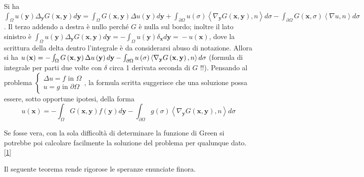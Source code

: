 \documentclass{article}
\begin{document}
Si ha $\int_{\Omega }u\left( \mathbf{y}\right) \Delta _{\mathbf{y}}G\left( 
\mathbf{x,y}\right) d\mathbf{y}=\int_{\Omega }G\left( \mathbf{x,y}\right)
\Delta u\left( \mathbf{y}\right) d\mathbf{y}+\int_{\partial \Omega }u\left(
\sigma \right) \left\langle \nabla _{\mathbf{y}}G\left( \mathbf{x,y}\right)
,n\right\rangle d\sigma -\int_{\partial \Omega }G\left( \mathbf{x},\sigma
\right) \left\langle \nabla u,n\right\rangle d\sigma $. Il terzo addendo a
destra \`{e} nullo perch\'{e} $G$ \`{e} nulla sul bordo; inoltre il lato
sinistro \`{e} $\int_{\Omega }u\left( \mathbf{y}\right) \Delta _{\mathbf{y}%
}G\left( \mathbf{x,y}\right) d\mathbf{y}=-\int_{\Omega }u\left( \mathbf{y}%
\right) \delta _{\mathbf{x}}d\mathbf{y=}-u\left( \mathbf{x}\right) $, dove
la scrittura della delta dentro l'integrale \`{e} da considerarsi abuso di
notazione. Allora si ha $u\left( \mathbf{x}\right) =-\int_{\Omega }G\left( 
\mathbf{x,y}\right) \Delta u\left( \mathbf{y}\right) d\mathbf{y}%
-\int_{\partial \Omega }u\left( \sigma \right) \left\langle \nabla _{\mathbf{%
y}}G\left( \mathbf{x,y}\right) ,n\right\rangle d\sigma $ (formula di
integrale per parti due volte con $\delta $ circa 1 derivata seconda di $G$%
!!). Pensando al problema $\left\{ 
\begin{array}{c}
\Delta u=f\text{ in }\Omega \\ 
u=g\text{ in }\partial \Omega%
\end{array}%
\right. $, la formula scritta suggerisce che una soluzione possa essere,
sotto opportune ipotesi, della forma%
\begin{equation}
u\left( \mathbf{x}\right) =-\int_{\Omega }G\left( \mathbf{x,y}\right)
f\left( \mathbf{y}\right) d\mathbf{y}-\int_{\partial \Omega }g\left( \sigma
\right) \left\langle \nabla _{\mathbf{y}}G\left( \mathbf{x,y}\right)
,n\right\rangle d\sigma  \label{1}
\end{equation}

Se fosse vera, con la sola difficolt\`{a} di determinare la funzione di
Green si potrebbe poi calcolare facilmente la soluzione del problema per
qualunque dato.\ref{1}

Il seguente teorema rende rigorose le speranze enunciate finora.
\end{document}
